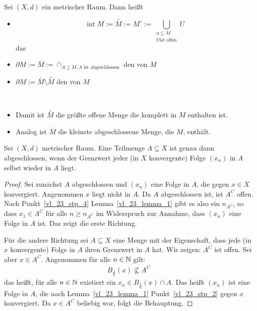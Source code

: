 \begin{Definition}{%
	Sei $(X,d)$ ein metrischer Raum. Dann heißt
	\begin{itemize}
		\item $$\mathop{int} M := \overset{\circ}{M} := M^{\circ} := \bigcup_{\substack{u \subseteq M\\ U \text{ist offen}}} U $$ das 
		\item $\partial M := \bar{M} := \cap_{A \supseteq M, A \text{ ist abgeschlossen}}$ den  von $M$ 
		\item $\partial M := \bar{M} \setminus \overset{\circ}{M}$ 
		den  von $M$
	\end{itemize}
}\end{Definition}

\begin{Bemerkung}{
	~\begin{itemize}
		\item Damit ist $\overset{\circ}{M}$ die größte offene Menge die komplett in 
	$M$ enthalten ist.
		\item Analog ist $\overline{M}$ die kleinste abgeschlossene Menge, die $M$, 
			enthält.
	\end{itemize}
}\end{Bemerkung}

\begin{Proposition}{\label{vl_23_prop_2}%
	Sei $(X,d)$ metrischer Raum. Eine Teilmenge $A \subseteq X$ ist genau dann 
	abgeschlossen, wenn der Grenzwert jeder (in $X$ konvergente) Folge 
	$(x_n)$ in $A$ selbst wieder in $A$ liegt. 
}\end{Proposition}

\begin{proof}
	Sei zunächst $A$ abgeschlossen und $(x_n)$ eine Folge in $A$, die gegen 
	$x \in X$ konvergiert. Angenommen $x$ liegt nicht in $A$. Da $A$ abgeschlossen 
	ist, ist $A^C$ offen. Nach Punkt~\ref{vl_23_stp_4} Lemma~\ref{vl_23_lemma_1} 
	gibt es also ein $n_{A^C}$, so dass $x_1 \in A^C$ für alle $ n \geq n_{A^C}$ 
	im Widerspruch zur Annahme, dass $(x_n)$ eine Folge in $A$ ist. 
	Das zeigt die erste Richtung.

	Für die andere Richtung sei $A \subseteq X$ 
	eine Menge mit der Eigenschaft, dass jede (in $x$ konvergente) Folge in $A$ 
	ihren Grenzwert in $A$ hat. Wir zeigen: $A^C$ ist offen. Sei aber 
	$x \in A^C$. Angenommen für alle $n \in \mathbb{N}$ gilt: 
	\begin{align*}
		B_{\frac{1}{n}}(x) \not \subseteq A^C
	\end{align*}
	das heißt, für alle $n \in \mathbb{N}$ existiert ein $x_n \in B_{\frac{1}{n}}(x) 
	\cap A$. Das heißt $(x_n)$ ist eine Folge in $A$, die nach Lemma~\ref{vl_23_lemma_1}
	Punkt~\ref{vl_23_stp_2} gegen $x$ konvergiert.
	Da $x \in A^C$ beliebig war, folgt die Behauptung.
\end{proof}

